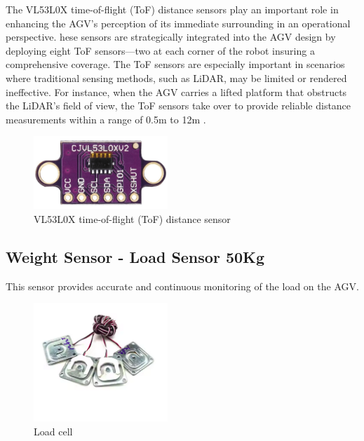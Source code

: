 \documentclass[../../main]{subfiles}
\begin{document}
The VL53L0X time-of-flight (ToF) distance sensors  play an important role in enhancing 
the AGV's perception of its immediate surrounding in an operational perspective. 
hese sensors are strategically integrated into the AGV design by deploying eight 
ToF sensors—two at each corner of the robot insuring a comprehensive coverage. 
The ToF sensors are especially important in scenarios where traditional sensing methods, 
such as LiDAR, may be limited or rendered ineffective. For instance, when the AGV carries 
a lifted platform that obstructs the LiDAR's field of view, the ToF sensors take over to provide reliable distance measurements within a range of 0.5m to 12m . 
\begin{figure}[H]
    \centering
    \includegraphics[width=0.45\textwidth]{fig/tof_sensor.png}
    \caption{ VL53L0X time-of-flight (ToF) distance sensor }
    \label{LVL53L0X ToF sensor } %
\end{figure}


\subsection{Weight Sensor - Load Sensor 50Kg}

This sensor provides accurate and continuous monitoring of the load on the AGV.

\begin{figure}[H]
    \centering
    \includegraphics[width=0.45\textwidth]{fig/4_cells.png}
    \caption{ Load cell }
    \label{Load cell} %
\end{figure}
\end{document}
